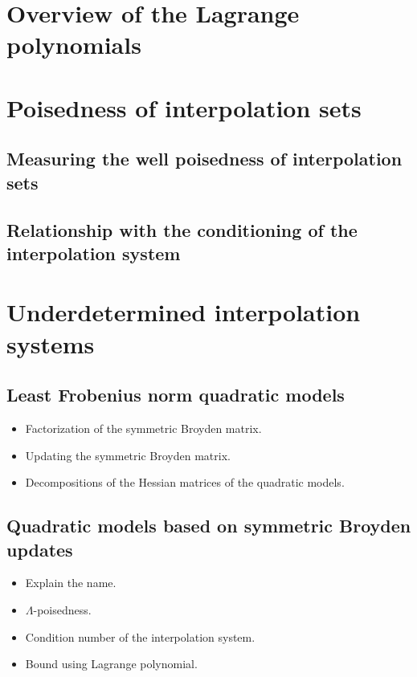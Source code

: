\section{Overview of the Lagrange polynomials}

\section{Poisedness of interpolation sets}
\label{sec:poisedness}

\subsection{Measuring the well poisedness of interpolation sets}

\subsection{Relationship with the conditioning of the interpolation system}

\section{Underdetermined interpolation systems}
\label{sec:underdetermined-interpolation}

\subsection{Least Frobenius norm quadratic models}

\begin{itemize}
    \item Factorization of the symmetric Broyden matrix.
    \item Updating the symmetric Broyden matrix.
    \item Decompositions of the Hessian matrices of the quadratic models.
\end{itemize}

\subsection{Quadratic models based on symmetric Broyden updates}

\begin{itemize}
    \item Explain the name.
    \item $\Lambda$-poisedness.     
    \item Condition number of the interpolation system.
    \item Bound using Lagrange polynomial.
\end{itemize}
